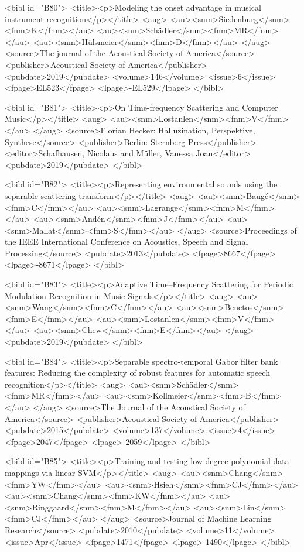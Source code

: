 \documentclass{bmcart}
\begin{document}
\begin{backmatter}
{<bibl id="B80">
  <title><p>Modeling the onset advantage in musical instrument
  recognition</p></title>
  <aug>
    <au><snm>Siedenburg</snm><fnm>K</fnm></au>
    <au><snm>Sch{\"a}dler</snm><fnm>MR</fnm></au>
    <au><snm>H{\"u}lsmeier</snm><fnm>D</fnm></au>
  </aug>
  <source>The journal of the Acoustical Society of America</source>
  <publisher>Acoustical Society of America</publisher>
  <pubdate>2019</pubdate>
  <volume>146</volume>
  <issue>6</issue>
  <fpage>EL523</fpage>
  <lpage>-EL529</lpage>
</bibl>

<bibl id="B81">
  <title><p>On Time-frequency Scattering and Computer Music</p></title>
  <aug>
    <au><snm>Lostanlen</snm><fnm>V</fnm></au>
  </aug>
  <source>Florian Hecker: Halluzination, Perspektive, Synthese</source>
  <publisher>Berlin: Sternberg Press</publisher>
  <editor>Schafhausen, Nicolaus and M\"{u}ller, Vanessa Joan</editor>
  <pubdate>2019</pubdate>
</bibl>

<bibl id="B82">
  <title><p>Representing environmental sounds using the separable scattering
  transform</p></title>
  <aug>
    <au><snm>Baug{\'e}</snm><fnm>C</fnm></au>
    <au><snm>Lagrange</snm><fnm>M</fnm></au>
    <au><snm>And{\'e}n</snm><fnm>J</fnm></au>
    <au><snm>Mallat</snm><fnm>S</fnm></au>
  </aug>
  <source>Proceedings of the IEEE International Conference on Acoustics, Speech
  and Signal Processing</source>
  <pubdate>2013</pubdate>
  <fpage>8667</fpage>
  <lpage>-8671</lpage>
</bibl>

<bibl id="B83">
  <title><p>Adaptive Time--Frequency Scattering for Periodic Modulation
  Recognition in Music Signals</p></title>
  <aug>
    <au><snm>Wang</snm><fnm>C</fnm></au>
    <au><snm>Benetos</snm><fnm>E</fnm></au>
    <au><snm>Lostanlen</snm><fnm>V</fnm></au>
    <au><snm>Chew</snm><fnm>E</fnm></au>
  </aug>
  <pubdate>2019</pubdate>
</bibl>

<bibl id="B84">
  <title><p>Separable spectro-temporal Gabor filter bank features: Reducing the
  complexity of robust features for automatic speech recognition</p></title>
  <aug>
    <au><snm>Sch{\"a}dler</snm><fnm>MR</fnm></au>
    <au><snm>Kollmeier</snm><fnm>B</fnm></au>
  </aug>
  <source>The Journal of the Acoustical Society of America</source>
  <publisher>Acoustical Society of America</publisher>
  <pubdate>2015</pubdate>
  <volume>137</volume>
  <issue>4</issue>
  <fpage>2047</fpage>
  <lpage>-2059</lpage>
</bibl>

<bibl id="B85">
  <title><p>Training and testing low-degree polynomial data mappings via linear
  SVM</p></title>
  <aug>
    <au><snm>Chang</snm><fnm>YW</fnm></au>
    <au><snm>Hsieh</snm><fnm>CJ</fnm></au>
    <au><snm>Chang</snm><fnm>KW</fnm></au>
    <au><snm>Ringgaard</snm><fnm>M</fnm></au>
    <au><snm>Lin</snm><fnm>CJ</fnm></au>
  </aug>
  <source>Journal of Machine Learning Research</source>
  <pubdate>2010</pubdate>
  <volume>11</volume>
  <issue>Apr</issue>
  <fpage>1471</fpage>
  <lpage>-1490</lpage>
</bibl>

}
\end{backmatter}
\end{document}
